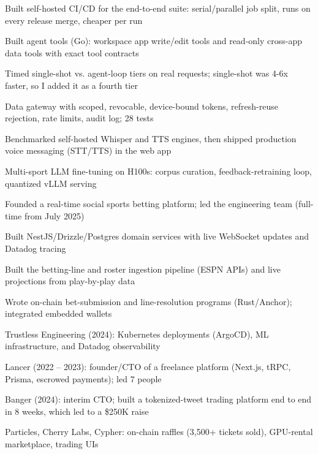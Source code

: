 \documentclass[print]{jack-resume}
\begin{document}
\begin{tightemize}
    \item Built self-hosted CI/CD for the end-to-end suite: serial/parallel job split, runs on every release merge, cheaper per run
    \item Built agent tools (Go): workspace app write/edit tools and read-only cross-app data tools with exact tool contracts
    \item Timed single-shot vs. agent-loop tiers on real requests; single-shot was 4-6x faster, so I added it as a fourth tier
    \item Data gateway with scoped, revocable, device-bound tokens, refresh-reuse rejection, rate limits, audit log; 28 tests
    \item Benchmarked self-hosted Whisper and TTS engines, then shipped production voice messaging (STT/TTS) in the web app
    \item Multi-sport LLM fine-tuning on H100s: corpus curation, feedback-retraining loop, quantized vLLM serving
\end{tightemize}
\sectionsep

\begin{tightemize}
    \item Founded a real-time social sports betting platform; led the engineering team (full-time from July 2025)
    \item Built NestJS/Drizzle/Postgres domain services with live WebSocket updates and Datadog tracing
    \item Built the betting-line and roster ingestion pipeline (ESPN APIs) and live projections from play-by-play data
    \item Wrote on-chain bet-submission and line-resolution programs (Rust/Anchor); integrated embedded wallets
\end{tightemize}
\sectionsep

\begin{tightemize}
    \item Trustless Engineering (2024): Kubernetes deployments (ArgoCD), ML infrastructure, and Datadog observability
    \item Lancer (2022 – 2023): founder/CTO of a freelance platform (Next.js, tRPC, Prisma, escrowed payments); led 7 people
    \item Banger (2024): interim CTO; built a tokenized-tweet trading platform end to end in 8 weeks, which led to a \$250K raise
    \item Particles, Cherry Labs, Cypher: on-chain raffles (3,500+ tickets sold), GPU-rental marketplace, trading UIs
\end{tightemize}
\sectionsep
\end{document}

